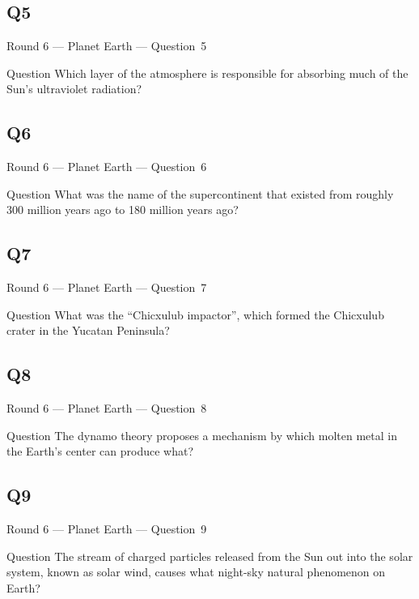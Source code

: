 \documentclass[11pt]{beamer}
\begin{document}
\subsection*{Q5}
\begin{frame}[t]{Round 6 --- Planet Earth --- \mbox{Question 5}}
\vspace{-0.5em}
\begin{block}{Question}
Which layer of the atmosphere is responsible for absorbing much of the Sun's ultraviolet radiation?
\end{block}
\end{frame}
\subsection*{Q6}
\begin{frame}[t]{Round 6 --- Planet Earth --- \mbox{Question 6}}
\vspace{-0.5em}
\begin{block}{Question}
What was the name of the supercontinent that existed from roughly 300 million years ago to 180 million years ago?
\end{block}
\end{frame}
\subsection*{Q7}
\begin{frame}[t]{Round 6 --- Planet Earth --- \mbox{Question 7}}
\vspace{-0.5em}
\begin{block}{Question}
What was the ``Chicxulub impactor'', which formed the Chicxulub crater in the Yucatan Peninsula?
\end{block}
\end{frame}
\subsection*{Q8}
\begin{frame}[t]{Round 6 --- Planet Earth --- \mbox{Question 8}}
\vspace{-0.5em}
\begin{block}{Question}
The dynamo theory proposes a mechanism by which molten metal in the Earth's center can produce what?
\end{block}
\end{frame}
\subsection*{Q9}
\begin{frame}[t]{Round 6 --- Planet Earth --- \mbox{Question 9}}
\vspace{-0.5em}
\begin{block}{Question}
The stream of charged particles released from the Sun out into the solar system, known as solar wind, causes what night-sky natural phenomenon on Earth?
\end{block}
\end{frame}
\end{document}
